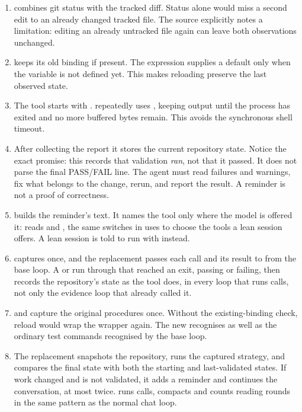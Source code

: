 \begin{enumerate}
\item {} combines git status with the tracked diff.
  Status alone would miss a second edit to an already changed tracked file.
  The source explicitly notes a limitation: editing an already untracked
  file again can leave both observations unchanged.
\item {} keeps its old binding if present. The
   expression supplies a default only when the variable is not
  defined yet. This makes reloading preserve the last observed state.
\item The  tool starts  with
  .  repeatedly uses
  , keeping output until the process has exited and no
  more buffered bytes remain. This avoids the synchronous shell timeout.
\item After collecting the report it stores the current repository state.
  Notice the exact promise: this records that validation \emph{ran}, not
  that it passed. It does not parse the final PASS/FAIL line. The agent must
  read failures and warnings, fix what belongs to the change, rerun, and
  report the result. A reminder is not a proof of correctness.
\item {} builds the reminder's text. It names the
   tool only where the model is offered it:
   reads  and ,
  the same switches  in 
  uses to choose the tools a lean session offers. A lean session is told
  to run  with  instead.
\item {} captures  once, and the
  replacement passes each call and its result to  from
  the base loop. A  or 
  run through  that reached an exit, passing or failing,
  then records the repository's state as the tool does, in every loop that
  runs calls, not only the evidence loop that already called it.
\item {} and
   capture the original procedures once.
  Without the existing-binding check, reload would wrap the wrapper again.
  The new  recognises  as well as the
  ordinary test commands recognised by the base loop.
\item The replacement  snapshots the repository,
  runs the captured strategy, and compares the final state with both the
  starting and last-validated states. If work changed and is not validated,
  it adds a reminder and continues the conversation, at most twice.
   runs calls, compacts and counts reading rounds
  in the same pattern as the normal chat loop.
\end{enumerate}

